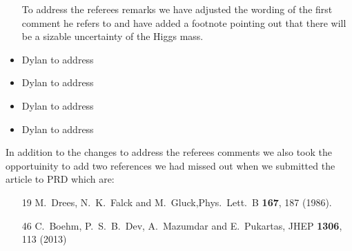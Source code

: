 \documentclass[12pt]{article}
\begin{document}
\begin{itemize}
To address the referees remarks we have adjusted the wording of the
first comment he refers to and have added a footnote pointing out that
there will be a sizable uncertainty of the Higgs mass.

\item Dylan to address

\item Dylan to address
\item Dylan to address
\item Dylan to address



\end{itemize}

In addition to the changes to address the referees comments we also took the opportuinity to add two references we had missed out when we submitted the article to PRD which are:
\begin{itemize}
\item [19]  M.~Drees, N.~K.~Falck and M.~Gluck,Phys.\ Lett.\ B {\bf 167}, 187 (1986).
\item [46]  C.~Boehm, P.~S.~B.~Dev, A.~Mazumdar and E.~Pukartas, JHEP {\bf 1306}, 113 (2013)
 \end{itemize}



 
\end{document}
